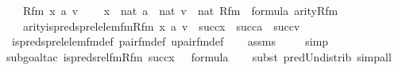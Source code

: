 \begin{isabellebody}
\ \ \ Rfm\ x\ a\ v\ \isanewline
\ \ \ {\isachardoublequoteopen}x\ {\isasymin}\ nat{\isachardoublequoteclose}\ {\isachardoublequoteopen}a\ {\isasymin}\ nat{\isachardoublequoteclose}\ {\isachardoublequoteopen}v\ {\isasymin}\ nat{\isachardoublequoteclose}\ {\isachardoublequoteopen}Rfm\ {\isasymin}\ formula{\isachardoublequoteclose}\ {\isachardoublequoteopen}arity{\isacharparenleft}{\kern0pt}Rfm{\isacharparenright}{\kern0pt}\ {\isacharequal}{\kern0pt}\ {}{\isachardoublequoteclose}\isanewline
\ \ \ {\isachardoublequoteopen}arity{\isacharparenleft}{\kern0pt}is{\isacharunderscore}{\kern0pt}preds{\isacharunderscore}{\kern0pt}prel{\isacharunderscore}{\kern0pt}elem{\isacharunderscore}{\kern0pt}fm{\isacharparenleft}{\kern0pt}Rfm{\isacharcomma}{\kern0pt}\ x{\isacharcomma}{\kern0pt}\ a{\isacharcomma}{\kern0pt}\ v{\isacharparenright}{\kern0pt}{\isacharparenright}{\kern0pt}\ {\isasymle}\ succ{\isacharparenleft}{\kern0pt}x{\isacharparenright}{\kern0pt}\ {\isasymunion}\ succ{\isacharparenleft}{\kern0pt}a{\isacharparenright}{\kern0pt}\ {\isasymunion}\ succ{\isacharparenleft}{\kern0pt}v{\isacharparenright}{\kern0pt}{\isachardoublequoteclose}\isanewline
%
\isadelimproof
\ \ %
\endisadelimproof
%
\isatagproof
{}\isamarkupfalse%
\ is{\isacharunderscore}{\kern0pt}preds{\isacharunderscore}{\kern0pt}prel{\isacharunderscore}{\kern0pt}elem{\isacharunderscore}{\kern0pt}fm{\isacharunderscore}{\kern0pt}def\ pair{\isacharunderscore}{\kern0pt}fm{\isacharunderscore}{\kern0pt}def\ upair{\isacharunderscore}{\kern0pt}fm{\isacharunderscore}{\kern0pt}def\isanewline
\ \ \isamarkupfalse%
\ assms\ \isanewline
\ \ \isamarkupfalse%
\ simp\isanewline
\ \ \isamarkupfalse%
{\isacharparenleft}{\kern0pt}subgoal{\isacharunderscore}{\kern0pt}tac\ {\isachardoublequoteopen}is{\isacharunderscore}{\kern0pt}preds{\isacharunderscore}{\kern0pt}rel{\isacharunderscore}{\kern0pt}fm{\isacharparenleft}{\kern0pt}Rfm{\isacharcomma}{\kern0pt}\ succ{\isacharparenleft}{\kern0pt}x{\isacharparenright}{\kern0pt}{\isacharcomma}{\kern0pt}\ {}{\isacharparenright}{\kern0pt}\ {\isasymin}\ formula{\isachardoublequoteclose}{\isacharparenright}{\kern0pt}\isanewline
\ \ \ \isamarkupfalse%
{\isacharparenleft}{\kern0pt}subst\ pred{\isacharunderscore}{\kern0pt}Un{\isacharunderscore}{\kern0pt}distrib{\isacharcomma}{\kern0pt}\ simp{\isacharunderscore}{\kern0pt}all{\isacharparenright}{\kern0pt}{\isacharplus}{\kern0pt}\isanewline
\ \ \ \isamarkupfalse%

\end{isabellebody}
